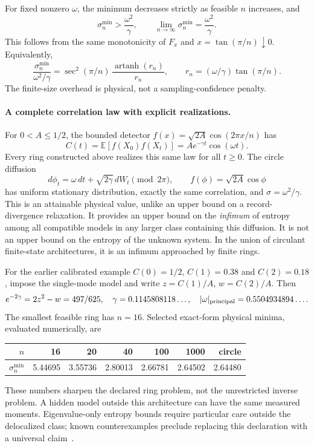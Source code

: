 For fixed nonzero $\omega$, the minimum decreases strictly as feasible $n$
increases, and
\begin{equation}
 \sigma_n^{\min}>\frac{\omega^2}{\gamma},\qquad
 \lim_{n\to\infty}\sigma_n^{\min}=\frac{\omega^2}{\gamma}.
 \label{eq:pa-circulant-limit}
\end{equation}
This follows from the same monotonicity of $F_x$ and $x=\tan(\pi/n)\downarrow0$.
Equivalently,
\[
 \frac{\sigma_n^{\min}}{\omega^2/\gamma}
 =\sec^2(\pi/n)\,
   \frac{\operatorname{artanh}(r_n)}{r_n},\qquad
 r_n=(\omega/\gamma)\tan(\pi/n).
\]
The finite-size overhead is physical, not a sampling-confidence penalty.

\paragraph{A complete correlation law with explicit realizations.}
For $0<A\leq1/2$, the bounded detector
$f(x)=\sqrt{2A}\cos(2\pi x/n)$ has
\begin{equation}
 C(t)=\mathbb E[f(X_0)f(X_t)]
     =A e^{-\gamma t}\cos(\omega t).
 \label{eq:pa-mode-correlation}
\end{equation}
Every ring constructed above realizes this same law for all $t\geq0$.
The circle diffusion
\[
 d\phi_t=\omega\,dt+\sqrt{2\gamma}\,dW_t\pmod{2\pi},\qquad
 f(\phi)=\sqrt{2A}\cos\phi
\]
has uniform stationary distribution, exactly the same correlation, and
$\sigma=\omega^2/\gamma$. This is an attainable physical value, unlike
an upper bound on a record-divergence relaxation. It provides an upper
bound on the \emph{infimum} of entropy among all compatible models in
any larger class containing this diffusion. It is not an upper bound on
the entropy of the unknown system. In the union of circulant finite-state
architectures, it is an infimum approached by finite rings.

For the earlier calibrated example $C(0)=1/2$, $C(1)=0.38$ and
$C(2)=0.18$, impose the single-mode model and write
$z=C(1)/A$, $w=C(2)/A$. Then
\[
 e^{-2\gamma}=2z^2-w=497/625,
 \quad \gamma=0.1145808118\ldots,
 \quad |\omega|_{\rm principal}=0.5504934894\ldots.
\]
The smallest feasible ring has $n=16$. Selected exact-form physical
minima, evaluated numerically, are
\begin{center}
\begin{tabular}{r|rrrrr|r}
$n$&16&20&40&100&1000&circle\\\hline
$\sigma_n^{\min}$&5.44695&3.55736&2.80013&2.66781&2.64502&2.64480
\end{tabular}
\end{center}
These numbers sharpen the declared ring problem, not the unrestricted
inverse problem. A hidden model outside this architecture can have the
same measured moments. Eigenvalue-only entropy bounds require particular
care outside the delocalized class; known counterexamples preclude replacing
this declaration with a universal claim~\cite{rfShiraishi2026}.


